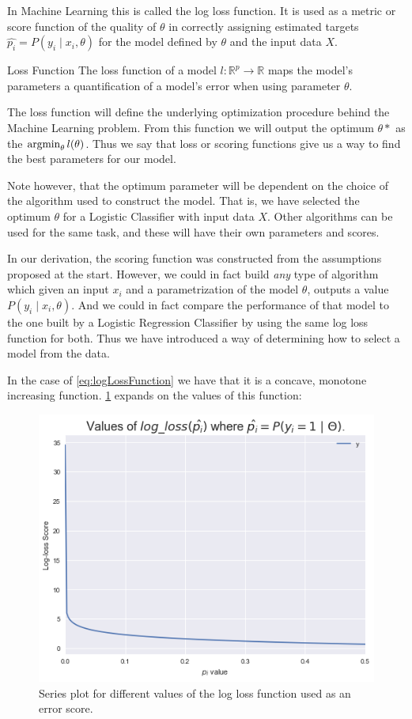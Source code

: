 In Machine Learning this is called the log loss function. It is used as a metric or score function of the quality of $\theta$ in correctly assigning estimated targets $ {\hat{p_i}} = P(y_i \mid x_i,\theta)$ for the model defined by $\theta$ and the input data $X$.


\begin{definition}{Loss Function}
The loss function of a model $l: \mathbb{R}^{ p} \rightarrow  \mathbb{R} $ maps the model's parameters a quantification of a model's error when using parameter $\theta$.
\end{definition}

The loss function will define the underlying optimization procedure behind the Machine Learning problem. From this function we will output the optimum $\theta*$ as the $\operatorname*{argmin}_{\theta} l(\theta) $. Thus we say that loss or scoring functions give us a way to find the best parameters for our model.

Note however, that the optimum parameter will be dependent on the choice of the algorithm used to construct the model. That is, we have selected the optimum $\theta$ for a Logistic Classifier with input data $X$. Other algorithms can be used for the same task, and these will have their own parameters and scores.

In our derivation, the scoring function was constructed from the assumptions proposed at the start. However, we could in fact build \textit{any} type of algorithm which given an input $x_i$ and a parametrization of the model $\theta$, outputs a value $P(y_i \mid x_i,\theta)$. And we could in fact compare the performance of that model to the one built by a Logistic Regression Classifier by using the same log loss function for both. Thus we have introduced a way of determining how to select a model from the data.

In the case of \cref{eq:logLossFunction} we have that it is a concave, monotone increasing function. \cref{figure-logLossValues} expands on the values of this function:

\begin{figure}[h!]
\begin{center}
\includegraphics[width=0.7\columnwidth]{figures/logloss/figure-logLossValues.png}
\caption{ Series plot for different values of the log loss function used as an error score.}
\label{figure-logLossValues}
\end{center}
\end{figure}

